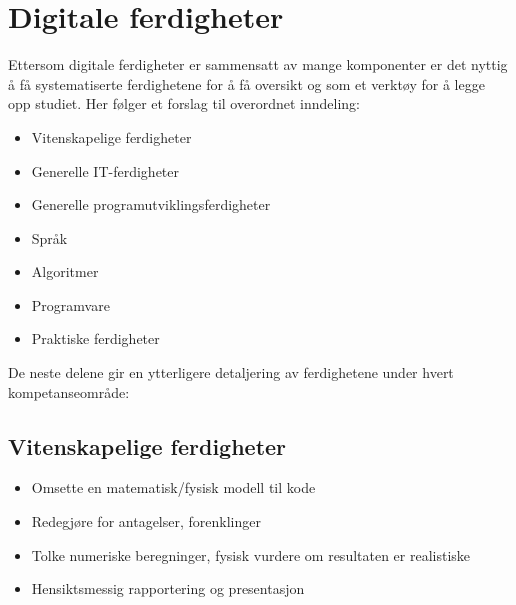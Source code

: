 \section{Digitale ferdigheter}

Ettersom digitale ferdigheter er sammensatt av mange komponenter er det nyttig å få systematiserte ferdighetene for å få oversikt og som et verktøy for å legge opp studiet. Her følger et forslag til overordnet inndeling:

\begin{itemize}
	\item Vitenskapelige ferdigheter
	\item Generelle IT-ferdigheter
	\item Generelle programutviklingsferdigheter
	\item Språk
	\item Algoritmer
	\item Programvare
	\item Praktiske ferdigheter
\end{itemize}

De neste delene gir en ytterligere detaljering av ferdighetene under hvert kompetanseområde:

\subsection{Vitenskapelige ferdigheter}
\begin{itemize}
	\item Omsette en matematisk/fysisk modell til kode
	\item Redegjøre for antagelser, forenklinger
	\item Tolke numeriske beregninger, fysisk vurdere om resultaten er realistiske
	\item Hensiktsmessig rapportering og presentasjon
\end{itemize}

